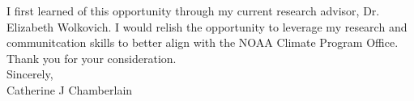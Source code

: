 \documentclass[11pt,a4paper]{letter}\usepackage[]{graphicx}\usepackage[]{color}
\begin{document}
\begin{letter}{}
\noindent I first learned of this opportunity through my current research advisor, Dr. Elizabeth Wolkovich. I would relish the opportunity to leverage my research and communitcation skills to better align with the NOAA Climate Program Office. Thank you for your consideration. \\


\noindent Sincerely,\\
\noindent Catherine J Chamberlain 

\end{letter}
\end{document}
